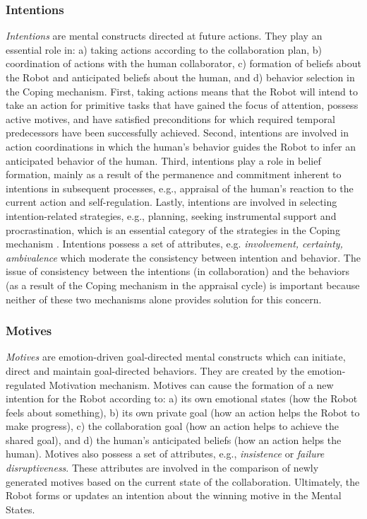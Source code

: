 \subsubsection{Intentions}
\label{sec:intentions}

\textit{Intentions} are mental constructs directed at future actions. They play
an essential role in: a) taking actions according to the collaboration plan, b)
coordination of actions with the human collaborator, c) formation of beliefs
about the Robot and anticipated beliefs about the human, and d) behavior
selection in the Coping mechanism. First, taking actions means that the Robot
will intend to take an action for primitive tasks that have gained the focus of
attention, possess active motives, and have satisfied preconditions for which
required temporal predecessors have been successfully achieved. Second,
intentions are involved in action coordinations in which the human's behavior
guides the Robot to infer an anticipated behavior of the human. Third,
intentions play a role in belief formation, mainly as a result of the permanence
and commitment inherent to intentions in subsequent processes, e.g., appraisal
of the human's reaction to the current action and self-regulation. Lastly,
intentions are involved in selecting intention-related strategies, e.g.,
planning, seeking instrumental support and procrastination, which is an
essential category of the strategies in the Coping mechanism
\cite{marsella:ema-process-model}. Intentions possess a set of attributes, e.g.
\textit{involvement, certainty, ambivalence} which moderate the consistency
between intention and behavior. The issue of consistency between the intentions
(in collaboration) and the behaviors (as a result of the Coping mechanism in the
appraisal cycle) is important because neither of these two mechanisms alone
provides solution for this concern.

\subsubsection{Motives}
\label{sec:motives}

\textit{Motives} are emotion-driven goal-directed mental constructs which can
initiate, direct and maintain goal-directed behaviors. They are created by the
emotion-regulated Motivation mechanism. Motives can cause the formation of a new
intention for the Robot according to: a) its own emotional states (how the Robot
feels about something), b) its own private goal (how an action helps the Robot
to make progress), c) the collaboration goal (how an action helps to achieve the
shared goal), and d) the human's anticipated beliefs (how an action helps the
human). Motives also possess a set of attributes, e.g., \textit{insistence} or
\textit{failure disruptiveness}. These attributes are involved in the comparison
of newly generated motives based on the current state of the collaboration.
Ultimately, the Robot forms or updates an intention about the winning motive in
the Mental States.

